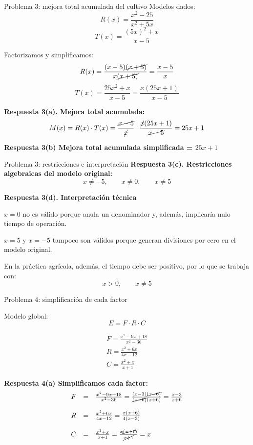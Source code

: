 \documentclass{beamer}
\begin{document}
	\begin{frame}{Problema 3: mejora total acumulada del cultivo}
		Modelos dados:
		\[
		R(x)=\frac{x^2-25}{x^2+5x}
		\]
		\[
		T(x)=\frac{(5x)^2+x}{x-5}
		\]
		
		Factorizamos y simplificamos:
		\[
		R(x)=\frac{(x-5){\cancel{(x+5)}}}{x\cancel{(x+5)}}=\frac{x-5}{x}
		\]
		\[
		T(x)=\frac{25x^2+x}{x-5}
		=\frac{x(25x+1)}{x-5}
		\]
		
		\textbf{Respuesta 3(a). Mejora total acumulada:}
		\[
		M(x)=R(x)\cdot T(x)
		=\frac{\cancel{x-5}}{\cancel{x}}\cdot \frac{\cancel{x}(25x+1)}{\cancel{x-5}}
		=25x+1
		\]
		
		\textbf{Respuesta 3(b) Mejora total acumulada simplificada = $25x+1$}
	\end{frame}
	
	\begin{frame}{Problema 3: restricciones e interpretación}
		\textbf{Respuesta 3(c). Restricciones algebraicas del modelo original:}
		\[
		x\neq -5,\qquad x\neq 0,\qquad x\neq 5
		\]
		
		\textbf{Respuesta 3(d). Interpretación técnica}
		
		\(x=0\) no es válido porque anula un denominador y, además, implicaría nulo tiempo de operación.
		
		\(x=5\) y \(x=-5\) tampoco son válidos porque generan divisiones por cero en el modelo original.
		
		En la práctica agrícola, además, el tiempo debe ser positivo, por lo que se trabaja con:
		\[
		x>0,\qquad x\neq 5
		\]
	\end{frame}
	
	\begin{frame}{Problema 4: simplificación de cada factor}
		
		Modelo global:
		\[	E=F\cdot R\cdot C	\]
		
		\[
		\begin{array}{l}
			F=\frac{x^2-9x+18}{x^2-36} \\
			R=\frac{x^2+6x}{4x-12} \\
			C=\frac{x^2+x}{x+1}
		\end{array}
		\]
		
		\textbf{Respuesta 4(a) Simplificamos cada factor:}
		\[
		\begin{array}{lcl}
			F&=&\frac{x^2-9x+18}{x^2-36}=\frac{(x-3)\cancel{(x-6)}}{\cancel{(x-6)}(x+6)}=\frac{x-3}{x+6}\\
			& & \\
			R&=&\frac{x^2+6x}{4x-12}=\frac{x(x+6)}{4(x-3)}\\
			& & \\
			C&=&\frac{x^2+x}{x+1}=\frac{x\cancel{(x+1)}}{\cancel{x+1}}=x
		\end{array}
		\]
		
	\end{frame}
	
\end{document}
